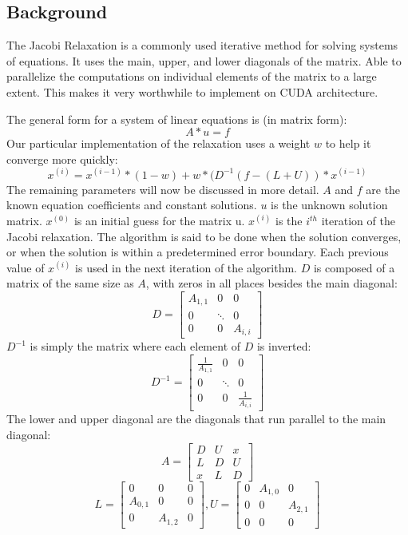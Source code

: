 \documentclass[10pt]{article}
\begin{document}
\begin{multicols}{2}
  \subsection{Background} %
  The Jacobi Relaxation is a commonly used iterative method for solving systems of equations.
  It uses the main, upper, and lower diagonals of the matrix.
  Able to parallelize the computations on individual elements of the matrix to a large extent.
  This makes it very worthwhile to implement on CUDA architecture.

  The general form for a system of linear equations is (in matrix form):
  \[A*u=f\]
  Our particular implementation of the relaxation uses a weight \(w\) to help it converge more quickly:
  \[x^{(i)} = x^{(i-1)} * (1-w)+w*(D^{-1}(f-(L+U))*x^{(i-1)}\]
  The remaining parameters will now be discussed in more detail.
  \(A\) and \(f\) are the known equation coefficients and constant solutions.
  \(u\) is the unknown solution matrix.
  \(x^{(0)}\) is an initial guess for the matrix u.
  \(x^{(i)}\) is the \(i^{th}\) iteration of the Jacobi relaxation.
  The algorithm is said to be done when the solution converges, or when the solution is within a predetermined error boundary.
  Each previous value of \(x^{(i)}\) is used in the next iteration of the algorithm.
  \(D\) is composed of a matrix of the same size as \(A\), with zeros in all places besides the main diagonal:
  \[
  D =
  \begin{bmatrix*}
    A_{1,1}     & 0         & 0 \\
    0           & \ddots    & 0 \\
    0           & 0         & A_{i,i}
  \end{bmatrix*}
  \]
  \(D^{-1}\) is simply the matrix where each element of \(D\) is inverted:
  \[
  D^{-1} =
  \begin{bmatrix*}
    \frac{1}{A_{1,1}}   & 0         & 0 \\
    0                   & \ddots    & 0 \\
    0                   & 0         & \frac{1}{A_{i,i}}
  \end{bmatrix*}
  \]
  The lower and upper diagonal are the diagonals that run parallel to the main diagonal:
  \[
  A=
  \begin{bmatrix*}
    D & U & x \\
    L & D & U \\
    x & L & D
  \end{bmatrix*}
  \]
  \[
  L=
  \begin{bmatrix*}
    0 & 0               & 0 \\
    A_{0,1} & 0         & 0 \\
    0       & A_{1,2}   & 0
  \end{bmatrix*}
  ,
  U=
  \begin{bmatrix*}
    0 & A_{1,0} & 0       \\
    0 & 0       & A_{2,1} \\
    0 & 0       & 0
  \end{bmatrix*}
  \]


\end{multicols}
\end{document}
